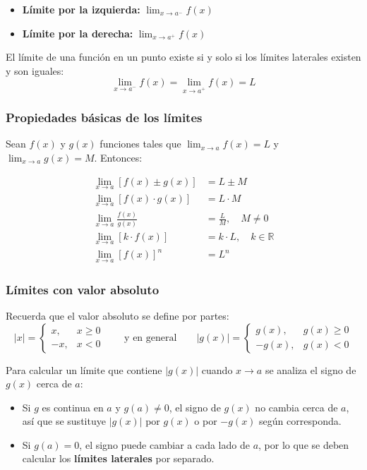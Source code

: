 \documentclass[12pt]{article}
\begin{document}
\begin{itemize}
    \item \textbf{Límite por la izquierda:} $\displaystyle \lim_{x \to a^-} f(x)$
    \item \textbf{Límite por la derecha:} $\displaystyle \lim_{x \to a^+} f(x)$
\end{itemize}

El límite de una función en un punto existe si y solo si los límites laterales existen y son iguales:
\[
\lim_{x \to a^-} f(x) = \lim_{x \to a^+} f(x) = L
\]



\subsubsection{Propiedades básicas de los límites}


Sean $f(x)$ y $g(x)$ funciones tales que $\lim_{x \to a} f(x) = L$ y $\lim_{x \to a} g(x) = M$. Entonces:

\begin{align*}
\lim_{x \to a} [f(x) \pm g(x)] &= L \pm M \\
\lim_{x \to a} [f(x) \cdot g(x)] &= L \cdot M \\
\lim_{x \to a} \frac{f(x)}{g(x)} &= \frac{L}{M}, \quad M \neq 0 \\
\lim_{x \to a} [k \cdot f(x)] &= k \cdot L, \quad k \in \mathbb{R} \\
\lim_{x \to a} [f(x)]^n &= L^n
\end{align*}



\subsubsection{Límites con valor absoluto}


Recuerda que el valor absoluto se define por partes:
\[
|x| =
\begin{cases}
x, & x \geq 0 \\
-x, & x < 0
\end{cases}
\qquad \text{y en general} \qquad
|g(x)| =
\begin{cases}
g(x), & g(x) \geq 0 \\
-g(x), & g(x) < 0
\end{cases}
\]

Para calcular un límite que contiene $|g(x)|$ cuando $x \to a$ se analiza el signo de $g(x)$ cerca de $a$:
\begin{itemize}
    \item Si $g$ es continua en $a$ y $g(a) \neq 0$, el signo de $g(x)$ no cambia cerca de $a$, así que se sustituye $|g(x)|$ por $g(x)$ o por $-g(x)$ según corresponda.
    \item Si $g(a) = 0$, el signo puede cambiar a cada lado de $a$, por lo que se deben calcular los \textbf{límites laterales} por separado.
\end{itemize}
\end{document}
